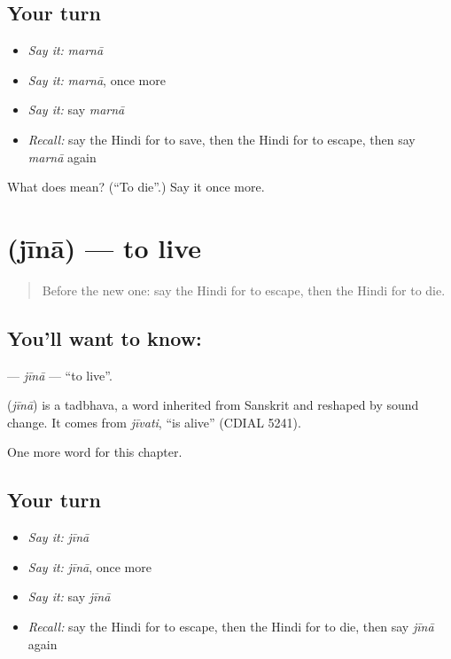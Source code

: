 \subsection*{Your turn}
\begin{itemize}
\raggedright
  \item \emph{Say it:} \emph{marnā}
  \item \emph{Say it:} \emph{marnā}, once more
  \item \emph{Say it:} say \emph{marnā}
  \item \emph{Recall:} say the Hindi for to save, then the Hindi for to escape, then say \emph{marnā} again
\end{itemize}

\begin{tcolorbox}[breakable,colback=teal!4,colframe=teal!35!black,title={Before you move on}]
What does  mean? (\textquotedblleft{}To die\textquotedblright{}.) Say it once more.
\end{tcolorbox}
\section[\texorpdfstring{\hi{जीना} (jīnā)}{जीना (jīnā)}]{ (jīnā) — to live}

\label{lesson:HI-C170-jina}



\begin{quote}
Before the new one: say the Hindi for to escape, then the Hindi for to die.
\end{quote}

\subsection*{You'll want to know: }
\textbf{} — \emph{jīnā} — \textquotedblleft{}to live\textquotedblright{}.

\begin{cousinweb}
\textbf{} (\emph{jīnā}) is a tadbhava, a word inherited from Sanskrit and reshaped by sound change. It comes from \emph{jīvati}, \textquotedblleft{}is alive\textquotedblright{} (CDIAL 5241).
\end{cousinweb}

\begin{grammarlens}[title={What you've built}]
One more word for this chapter.
\end{grammarlens}

\subsection*{Your turn}
\begin{itemize}
\raggedright
  \item \emph{Say it:} \emph{jīnā}
  \item \emph{Say it:} \emph{jīnā}, once more
  \item \emph{Say it:} say \emph{jīnā}
  \item \emph{Recall:} say the Hindi for to escape, then the Hindi for to die, then say \emph{jīnā} again
\end{itemize}

